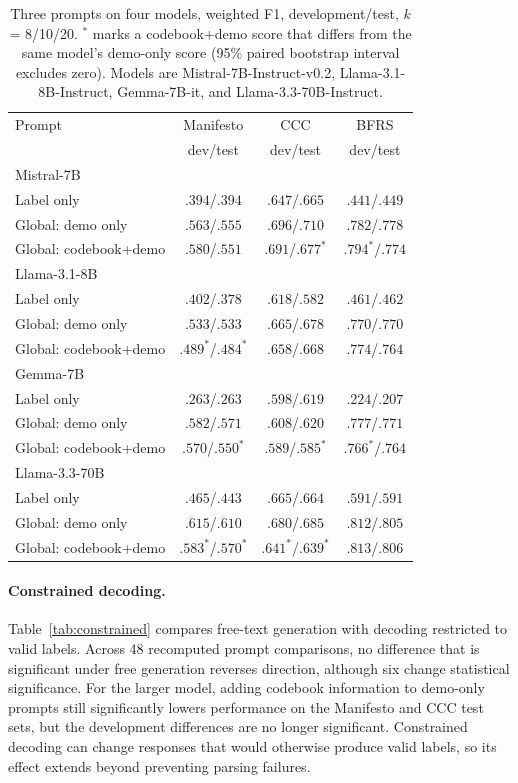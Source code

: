 \documentclass[11pt]{article}
\begin{document}
\begin{table}[!t]
\centering
\begin{tabular}{lccc}
\toprule
Prompt & Manifesto & CCC & BFRS \\
 & dev/test & dev/test & dev/test \\
\midrule
\multicolumn{4}{l}{Mistral-7B} \\
Label only & $.394$/$.394$ & $.647$/$.665$ & $.441$/$.449$ \\
Global: demo only & $.563$/$.555$ & $.696$/$.710$ & $.782$/$.778$ \\
Global: codebook+demo & $.580$/$.551$ & $.691$/$.677^*$ & $.794^*$/$.774$ \\
\midrule
\multicolumn{4}{l}{Llama-3.1-8B} \\
Label only & $.402$/$.378$ & $.618$/$.582$ & $.461$/$.462$ \\
Global: demo only & $.533$/$.533$ & $.665$/$.678$ & $.770$/$.770$ \\
Global: codebook+demo & $.489^*$/$.484^*$ & $.658$/$.668$ & $.774$/$.764$ \\
\midrule
\multicolumn{4}{l}{Gemma-7B} \\
Label only & $.263$/$.263$ & $.598$/$.619$ & $.224$/$.207$ \\
Global: demo only & $.582$/$.571$ & $.608$/$.620$ & $.777$/$.771$ \\
Global: codebook+demo & $.570$/$.550^*$ & $.589$/$.585^*$ & $.766^*$/$.764$ \\
\midrule
\multicolumn{4}{l}{Llama-3.3-70B} \\
Label only & $.465$/$.443$ & $.665$/$.664$ & $.591$/$.591$ \\
Global: demo only & $.615$/$.610$ & $.680$/$.685$ & $.812$/$.805$ \\
Global: codebook+demo & $.583^*$/$.570^*$ & $.641^*$/$.639^*$ & $.813$/$.806$ \\
\bottomrule
\end{tabular}
\caption{Three prompts on four models, weighted F1, development/test, $k$ = 8/10/20. $^*$ marks a codebook+demo score that differs from the same model's demo-only score (95\% paired bootstrap interval excludes zero). Models are Mistral-7B-Instruct-v0.2, Llama-3.1-8B-Instruct, Gemma-7B-it, and Llama-3.3-70B-Instruct.}
\label{tab:models}
\end{table}

\paragraph{Constrained decoding.}
Table~\ref{tab:constrained} compares free-text generation with decoding restricted to valid labels. Across 48 recomputed prompt comparisons, no difference that is significant under free generation reverses direction, although six change statistical significance. For the larger model, adding codebook information to demo-only prompts still significantly lowers performance on the Manifesto and CCC test sets, but the development differences are no longer significant. Constrained decoding can change responses that would otherwise produce valid labels, so its effect extends beyond preventing parsing failures.
\end{document}
